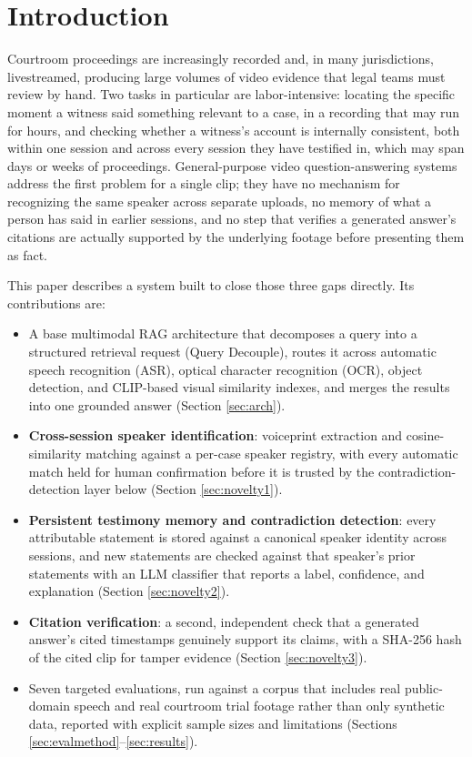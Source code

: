 \documentclass[3p,times,procedia]{elsarticle}
\begin{document}

\vspace*{-6pt}

\section{Introduction}
\label{sec:intro}

Courtroom proceedings are increasingly recorded and, in many jurisdictions, livestreamed,
producing large volumes of video evidence that legal teams must review by hand. Two
tasks in particular are labor-intensive: locating the specific moment a witness said
something relevant to a case, in a recording that may run for hours, and checking
whether a witness's account is internally consistent, both within one session and
across every session they have testified in, which may span days or weeks of
proceedings. General-purpose video question-answering systems address the first
problem for a single clip; they have no mechanism for recognizing the same speaker
across separate uploads, no memory of what a person has said in earlier sessions, and
no step that verifies a generated answer's citations are actually supported by the
underlying footage before presenting them as fact.

This paper describes a system built to close those three gaps directly. Its
contributions are:
\begin{itemize}
\item A base multimodal RAG architecture that decomposes a query into a structured
retrieval request (Query Decouple), routes it across automatic speech recognition
(ASR), optical character recognition (OCR), object detection, and CLIP-based visual
similarity indexes, and merges the results into one grounded answer (Section
\ref{sec:arch}).
\item \textbf{Cross-session speaker identification}: voiceprint extraction and
cosine-similarity matching against a per-case speaker registry, with every automatic
match held for human confirmation before it is trusted by the contradiction-detection
layer below (Section \ref{sec:novelty1}).
\item \textbf{Persistent testimony memory and contradiction detection}: every
attributable statement is stored against a canonical speaker identity across sessions,
and new statements are checked against that speaker's prior statements with an LLM
classifier that reports a label, confidence, and explanation (Section
\ref{sec:novelty2}).
\item \textbf{Citation verification}: a second, independent check that a generated
answer's cited timestamps genuinely support its claims, with a SHA-256 hash of the
cited clip for tamper evidence (Section \ref{sec:novelty3}).
\item Seven targeted evaluations, run against a corpus that includes real
public-domain speech and real courtroom trial footage rather than only synthetic data,
reported with explicit sample sizes and limitations (Sections \ref{sec:evalmethod}--\ref{sec:results}).
\end{itemize}
\end{document}
